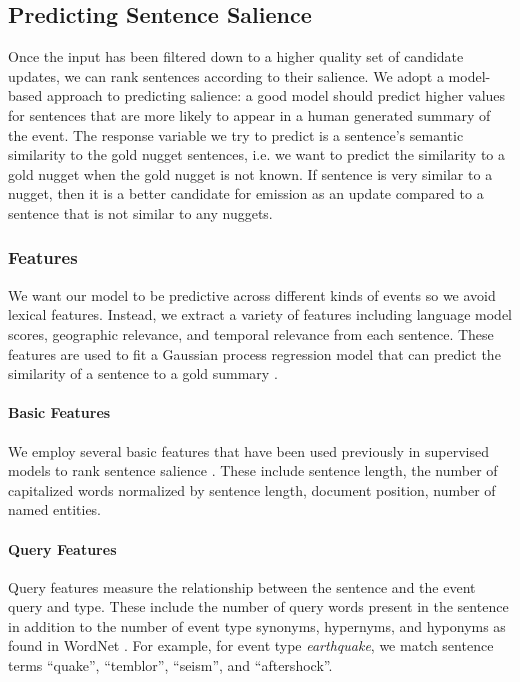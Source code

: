 \subsection{Predicting Sentence Salience}
\label{subsec:Predict}
Once the input has been filtered down to a higher quality set of candidate updates, we can rank sentences according to their salience.  We adopt a model-based approach to predicting salience: a good model should predict higher values for sentences that are more likely to appear in a human generated summary of the event.   The response variable we try to predict is a sentence's semantic similarity \cite{guo:wtmf} to the gold nugget sentences, i.e. we want to predict the similarity to a gold nugget when the gold nugget is not known.  If sentence is very similar to a nugget, then it is a better candidate for emission as an update compared to a sentence that is not similar to any nuggets.


\subsubsection{Features}
We want our model to be predictive across different kinds of events so we avoid lexical features.  Instead, we extract a variety of features including language model scores, geographic relevance, and temporal relevance from each sentence.  These features are used to fit a Gaussian process regression model that can predict the similarity of a sentence to a gold summary \cite{preotiuc2013temporal}.  

\paragraph{Basic Features}

We employ several basic features that have been used previously in supervised models to rank sentence salience \cite{kupiec1995trainable,conroy2001using}. These include sentence length, the number of capitalized words normalized by sentence length, document position, number of named entities.  

\paragraph{Query Features}

Query features measure the relationship between the sentence and the event query and type.  These include the number of query words present in the sentence in addition to the number of event type synonyms, hypernyms, and hyponyms as found in WordNet \cite{miller1995wordnet}.  For example, for event type \emph{earthquake},  we match sentence terms ``quake'', ``temblor'', ``seism'', and ``aftershock''.


